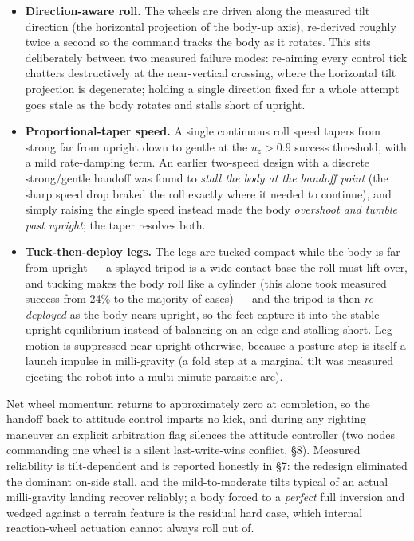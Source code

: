 \documentclass[conference]{IEEEtran}
\begin{document}
\begin{itemize}
\item \textbf{Direction-aware roll.} The wheels are driven along the measured tilt direction (the horizontal projection of the body-up axis), re-derived roughly twice a second so the command tracks the body as it rotates. This sits deliberately between two measured failure modes: re-aiming every control tick chatters destructively at the near-vertical crossing, where the horizontal tilt projection is degenerate; holding a single direction fixed for a whole attempt goes stale as the body rotates and stalls short of upright.
\item \textbf{Proportional-taper speed.} A single continuous roll speed tapers from strong far from upright down to gentle at the $u_z > 0.9$ success threshold, with a mild rate-damping term. An earlier two-speed design with a discrete strong/gentle handoff was found to \emph{stall the body at the handoff point} (the sharp speed drop braked the roll exactly where it needed to continue), and simply raising the single speed instead made the body \emph{overshoot and tumble past upright}; the taper resolves both.
\item \textbf{Tuck-then-deploy legs.} The legs are tucked compact while the body is far from upright --- a splayed tripod is a wide contact base the roll must lift over, and tucking makes the body roll like a cylinder (this alone took measured success from 24\% to the majority of cases) --- and the tripod is then \emph{re-deployed} as the body nears upright, so the feet capture it into the stable upright equilibrium instead of balancing on an edge and stalling short. Leg motion is suppressed near upright otherwise, because a posture step is itself a launch impulse in milli-gravity (a fold step at a marginal tilt was measured ejecting the robot into a multi-minute parasitic arc).
\end{itemize}

Net wheel momentum returns to approximately zero at completion, so the handoff back to attitude control imparts no kick, and during any righting maneuver an explicit arbitration flag silences the attitude controller (two nodes commanding one wheel is a silent last-write-wins conflict, \S8). Measured reliability is tilt-dependent and is reported honestly in \S7: the redesign eliminated the dominant on-side stall, and the mild-to-moderate tilts typical of an actual milli-gravity landing recover reliably; a body forced to a \emph{perfect} full inversion and wedged against a terrain feature is the residual hard case, which internal reaction-wheel actuation cannot always roll out of.
\end{document}
